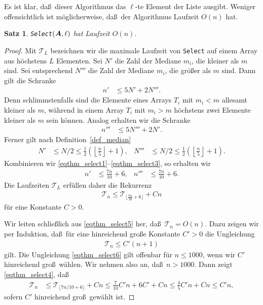 \documentclass[10pt,reqno]{amsart}
\numberwithin{equation}{section}
\newcommand\cT{\mathcal T}
\newcommand\vA{\vec A}
\def\vec#1{\mathchoice{\mbox{\boldmath$\displaystyle#1$}}
{\mbox{\boldmath$\textstyle#1$}}
{\mbox{\boldmath$\scriptstyle#1$}}
{\mbox{\boldmath$\scriptscriptstyle#1$}}}
\newtheorem{theorem}[definition]{Satz}
\newcommand\bc[1]{\left({#1}\right)}
\begin{document}
Es ist klar, da\ss\ dieser Algorithmus das $\ell$-te Element der Liste ausgibt.
Weniger offensichtlich ist m\"oglicherweise, da\ss\ der Algorithmus Laufzeit $O(n)$ hat.

\begin{theorem}\label{thm_select}
	{\tt Select}$(\vA,\ell)$ hat Laufzeit $O(n)$.
\end{theorem}
\begin{proof}
	Mit $\cT_L$ bezeichnen wir die maximale Laufzeit von {\tt Select} auf einem Array aus h\"ochstens $L$ Elementen.
	Sei $N'$ die Zahl der Mediane $m_i$, die kleiner als $m$ sind.
	Sei entsprechend $N'''$ die Zahl der Mediane $m_i$, die gr\"o\ss er als $m$ sind.
	Dann gilt die Schranke
	\begin{align}\label{eqthm_select1}
		n'&\leq5N'+2N'''.
	\end{align}
	Denn schlimmstenfalls sind die Elemente eines Arrays $T_i$ mit $m_i<m$ allesamt kleiner als $m$, w\"ahrend in einem Array $T_i$ mit $m_i>m$ h\"ochstens zwei Elemente kleiner als $m$ sein k\"onnen.
	Analog erhalten wir die Schranke
	\begin{align}\label{eqthm_select2}
		n'''&\leq5N'''+2N'.
	\end{align}
	Ferner gilt nach Definition~\ref{def_median}
	\begin{align}\label{eqthm_select3}
		N'&\leq N/2\leq\frac12\bc{\left\lfloor\frac n5\right\rfloor+1},&N'''&\leq N/2\leq\frac12\bc{\left\lfloor\frac n5\right\rfloor+1}.
	\end{align}
	Kombinieren wir \eqref{eqthm_select1}--\eqref{eqthm_select3}, so erhalten wir
	\begin{align}\label{eqthm_select4}
		n'&\leq\frac{7n}{10}+6,&n'''&\leq\frac{7n}{10}+6.
	\end{align}
	Die Laufzeiten $\cT_L$ erf\"ullen daher die Rekurrenz
	\begin{align}\label{eqthm_select5}
		\cT_n\leq\cT_{\lfloor\frac{7n}{10}+6\rfloor}+Cn
	\end{align}
	f\"ur eine Konstante $C>0$.

	Wir leiten schlie\ss lich aus \eqref{eqthm_select5} her, da\ss\ $\cT_n=O(n)$.
	Dazu zeigen wir per Induktion, da\ss\ f\"ur eine hinreichend gro\ss e Konstante $C'>0$ die Ungleichung
	\begin{align}\label{eqthm_select6}
		\cT_n\leq C'(n+1)
	\end{align}
	gilt.
	Die Ungleichung \eqref{eqthm_select6} gilt offenbar f\"ur $n\leq1000$, wenn wir $C'$ hinreichend gro\ss\ w\"ahlen.
	Wir nehmen also an, da\ss\ $n>1000$.
	Dann zeigt \eqref{eqthm_select4}, da\ss
	\begin{align*}
		\cT_n&\leq \cT_{\lfloor 7n/10+6\rfloor}+Cn\leq \frac7{10}C'n+6C'+Cn\leq\frac45C'n+Cn\leq C'n,
	\end{align*}
	sofern $C'$ hinreichend gro\ss\ gew\"ahlt ist.
\end{proof}
\end{document}
